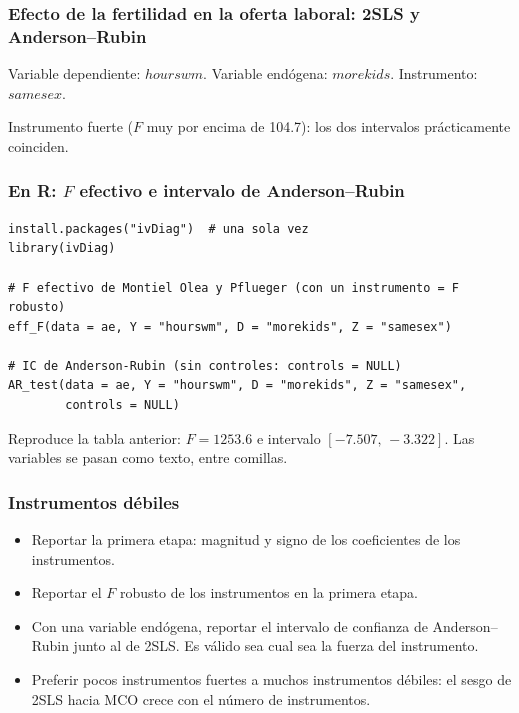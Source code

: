 \documentclass[t, compress, spanish, aspectratio=169]{beamer}
\newcommand{\term}[1]{\structure{\textbf{#1}}} %
\begin{document}
\begin{frame}
	\frametitle{Efecto de la fertilidad en la oferta laboral: 2SLS y Anderson--Rubin}
	Variable dependiente: $hourswm$. Variable end\'ogena: $morekids$. Instrumento: $samesex$.
	\begin{center}
	\small
	
	\end{center}
	\small
	Instrumento fuerte ($F$ muy por encima de 104.7): los dos intervalos pr\'acticamente coinciden.
\end{frame}
\begin{frame}[fragile]
	\frametitle{En R: $F$ efectivo e intervalo de Anderson--Rubin}
\footnotesize
\begin{verbatim}
install.packages("ivDiag")  # una sola vez
library(ivDiag)

# F efectivo de Montiel Olea y Pflueger (con un instrumento = F robusto)
eff_F(data = ae, Y = "hourswm", D = "morekids", Z = "samesex")

# IC de Anderson-Rubin (sin controles: controls = NULL)
AR_test(data = ae, Y = "hourswm", D = "morekids", Z = "samesex",
        controls = NULL)
\end{verbatim}
\small
Reproduce la tabla anterior: $F=1253.6$ e intervalo $[-7.507,\,-3.322]$. Las variables se pasan como texto, entre comillas.
\end{frame}
\begin{frame}
    \frametitle{Instrumentos d\'ebiles}
\term{Recomendaciones}
    \begin{itemize}
            \item Reportar la primera etapa: magnitud y signo de los coeficientes de los instrumentos.
            \item Reportar el $F$ robusto de los instrumentos en la primera etapa.
            \item Con una variable end\'ogena, reportar el intervalo de confianza de Anderson--Rubin junto al de 2SLS. Es v\'alido sea cual sea la fuerza del instrumento.
            \item Preferir pocos instrumentos fuertes a muchos instrumentos d\'ebiles: el sesgo de 2SLS hacia MCO crece con el n\'umero de instrumentos.
    \end{itemize}
\end{frame}
\end{document}
